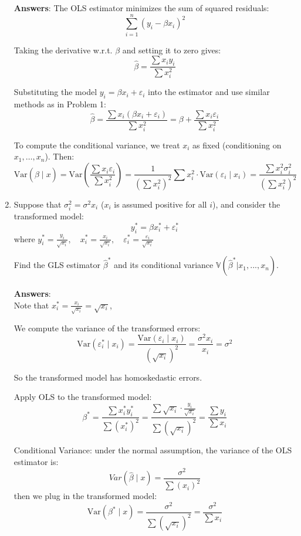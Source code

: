 \documentclass{article}
\begin{document}
\begin{flushleft}
\begin{enumerate}
\textbf{Answers}: The OLS estimator minimizes the sum of squared residuals:
\[
\sum_{i=1}^n (y_i - \beta x_i)^2
\]

Taking the derivative w.r.t. $\beta$ and setting it to zero gives:
\[
\hat{\beta} = \frac{\sum x_i y_i}{\sum x_i^2}
\]

Substituting the model $y_i = \beta x_i + \varepsilon_i$ into the estimator and use similar methods as in Problem 1:
\[
\hat{\beta} = \frac{\sum x_i (\beta x_i + \varepsilon_i)}{\sum x_i^2}
= \beta + \frac{\sum x_i \varepsilon_i}{\sum x_i^2}
\]

To compute the conditional variance, we treat $x_i$ as fixed (conditioning on $x_1, \dots, x_n$). Then:
\[
\text{Var}(\hat{\beta} \mid x) = \text{Var} \left( \frac{\sum x_i \varepsilon_i}{\sum x_i^2} \right)
= \frac{1}{\left(\sum x_i^2\right)^2} \sum x_i^2 \cdot \text{Var}(\varepsilon_i \mid x_i)
= \frac{\sum x_i^2 \sigma_i^2}{\left( \sum x_i^2 \right)^2}
\]

\item Suppose that $\sigma_i^2=\sigma^2 x_i$ ($x_i$ is assumed positive for all $i$), and consider the transformed model:
\[
y_i^* = \beta x_i^* + \varepsilon_i^*
\]
where
    $y_i^*=\frac{y_i}{\sqrt{x_i}}, \quad x_i^*=\frac{x_i}{\sqrt{x_i}}, \quad \varepsilon_i^*=\frac{\varepsilon_i}{\sqrt{x_i}}$

Find the GLS estimator $\hat{\beta}^*$ and its conditional variance $\mathbb{V}(\hat{\beta}^*|x_1,...,x_n)$.\\~\\
\textbf{Answers}:\\Note that $x_i^*=\frac{x_i}{\sqrt{x_i}}=\sqrt{x_i}$,

We compute the variance of the transformed errors:
\[
\text{Var}(\varepsilon_i^* \mid x_i) = \frac{\text{Var}(\varepsilon_i \mid x_i)}{(\sqrt{x_i})^2} = \frac{\sigma^2 x_i}{x_i} = \sigma^2
\]

So the transformed model has homoskedastic errors.

Apply OLS to the transformed model:
\[
\beta^* = \frac{\sum x_i^* y_i^*}{\sum (x_i^*)^2}
= \frac{\sum \sqrt{x_i} \cdot \frac{y_i}{\sqrt{x_i}}}{\sum (\sqrt{x_i})^2}= \frac{\sum y_i}{\sum x_i}
\]

Conditional Variance:
under the normal assumption, the variance of the OLS estimator is:
\[
Var(\hat{\beta} \mid x) = \frac{\sigma^2}{\sum (x_i)^2}
\]
then we plug in the transformed model:
\[
\text{Var}(\beta^* \mid x) = \frac{\sigma^2}{\sum (\sqrt{x_i})^2}= \frac{\sigma^2}{\sum x_i}
\]


\end{enumerate}
\end{flushleft}
\end{document}
